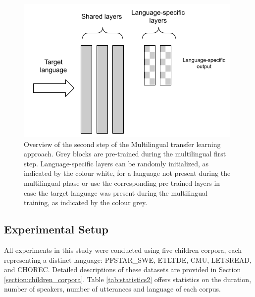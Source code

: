 
\begin{figure}[h]
\begin{center}
\includegraphics[scale=0.7]{imgs/Ours_final.png}
\caption{Overview of the second step of the Multilingual transfer learning approach. Grey blocks are pre-trained during the multilingual first step. Language-specific layers can be randomly initialized, as indicated by the colour white, for a language not present during the multilingual phase or use the corresponding pre-trained layers in case the target language was present during the multilingual training, as indicated by the colour grey.}
\label{fig:MLTL1}
\end{center}
\end{figure}


\subsection{Experimental Setup}
\label{section:corpus}
All experiments in this study were conducted using five children corpora, each representing a distinct language: PFSTAR\_SWE, ETLTDE, CMU, LETSREAD, and CHOREC. Detailed descriptions of these datasets are provided in Section \ref{section:children_corpora}. Table \ref{tab:statistics2} offers statistics on the duration, number of speakers, number of utterances and language of each corpus.

